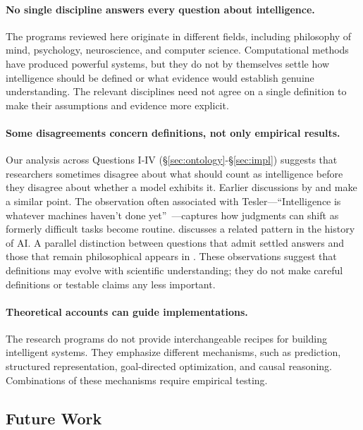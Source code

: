 \documentclass[acmsmall,screen,review,anonymous]{acmart}
\begin{document}
\paragraph{No single discipline answers every question about intelligence.}
The programs reviewed here originate in different fields, including philosophy of mind, psychology, neuroscience, and computer science.
%
Computational methods have produced powerful systems, but they do not by themselves settle how intelligence should be defined or what evidence would establish genuine understanding.
%
The relevant disciplines need not agree on a single definition to make their assumptions and evidence more explicit.

\paragraph{Some disagreements concern definitions, not only empirical results.}
Our analysis across Questions I-IV (\S\ref{sec:ontology}-\S\ref{sec:impl}) suggests that researchers sometimes disagree about what should count as intelligence before they disagree about whether a model exhibits it.
%
Earlier discussions by \citet{legg2007collectiondefinitionsintelligence} and \citet{wang2019define} make a similar point.
%
The observation often associated with Tesler---``Intelligence is whatever machines haven't done yet''~\citep{tesler1970}---captures how judgments can shift as formerly difficult tasks become routine.
%
\citet{chollet2019measureintelligence} discusses a related pattern in the history of AI.
%
A parallel distinction between questions that admit settled answers and those that remain philosophical appears in \citet{russell1997problems}.
%
These observations suggest that definitions may evolve with scientific understanding; they do not make careful definitions or testable claims any less important.

\paragraph{Theoretical accounts can guide implementations.}
The research programs do not provide interchangeable recipes for building intelligent systems.
%
They emphasize different mechanisms, such as prediction, structured representation, goal-directed optimization, and causal reasoning.
%
Combinations of these mechanisms require empirical testing.

\subsection{Future Work}
\label{subsec:future-work}
\end{document}
